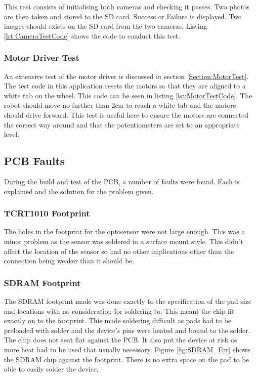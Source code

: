 This test consists of initialising both cameras and checking it passes. Two photos are then taken and stored to the SD card. Success or Failure is displayed. Two images should exists on the SD card from the two cameras. Listing \ref{lst:CameraTestCode} shows the code to conduct this test.


\subsubsection{Motor Driver Test}
An extensive test of the motor driver is discussed in section \ref{Section:MotorTest}. The test code in this application resets the motors so that they are aligned to a white tab on the wheel. This code can be seen in listing \ref{lst:MotorTestCode}. The robot should move no further than 2cm to reach a white tab and the motors should drive forward. This test is useful here to ensure the motors are connected the correct way around and that the potentiometers are set to an appropriate level.



\subsection{PCB Faults}
During the build and test of the PCB, a number of faults were found. Each is explained and the solution for the problem given. 
\subsubsection{TCRT1010 Footprint}
The holes in the footprint for the optosensor were not large enough. This was a minor problem as the sensor was soldered in a surface mount style. This didn't affect the location of the sensor so had no other implications other than the connection being weaker than it should be. 
\subsubsection{SDRAM Footprint}
The SDRAM footprint made was done exactly to the specification of the pad size and locations with no consideration for soldering to. This meant the chip fit exactly on to the footprint. This made soldering difficult as pads had to be preloaded with solder and the device's pins were heated and bound to the solder. The chip does not seat flat against the PCB. It also put the device at risk as more heat had to be used that usually necessary. Figure \ref{fig:SDRAM_Err} shows the SDRAM chip against the footprint. There is no extra space on the pad to be able to easily solder the device.

